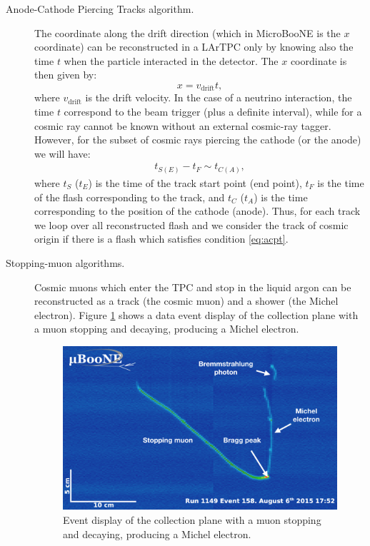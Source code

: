 \begin{description}
\item[Anode-Cathode Piercing Tracks algorithm.] The coordinate along the drift direction (which in MicroBooNE is the $x$ coordinate) can be reconstructed in a LArTPC only by knowing also the time $t$ when the particle interacted in the detector. The $x$ coordinate is then given by:
\begin{equation}
    x = v_{\mathrm{drift}}t,
\end{equation}
where $v_{\mathrm{drift}}$ is the drift velocity. In the case of a neutrino interaction, the time $t$ correspond to the beam trigger (plus a definite interval), while for a cosmic ray cannot be known without an external cosmic-ray tagger.
However, for the subset of cosmic rays piercing the cathode (or the anode) we will have:
\begin{align}
    t_{S(E)} - t_F \sim t_{C(A)},\label{eq:acpt}
\end{align}
where $t_S$ ($t_E$) is the time of the track start point (end point), $t_F$ is the time of the flash corresponding to the track, and $t_C$ ($t_A$) is the time corresponding to the position of the cathode (anode). Thus, for each track we loop over all reconstructed flash and we consider the track of cosmic origin if there is a flash which satisfies condition \eqref{eq:acpt}.

\item[Stopping-muon algorithms.] Cosmic muons which enter the TPC and stop in the liquid argon can be reconstructed as a track (the cosmic muon) and a shower (the Michel electron). Figure \ref{fig:michel_evd} shows a data event display of the collection plane with a muon stopping and decaying, producing a Michel electron. 

\begin{figure}[htbp]
\centering
  \includegraphics[width=0.75\linewidth]{figures/michel_evd.png}
  \caption{Event display of the collection plane with a muon stopping and decaying, producing a Michel electron.}
  \label{fig:michel_evd}
\end{figure}


\end{description}
